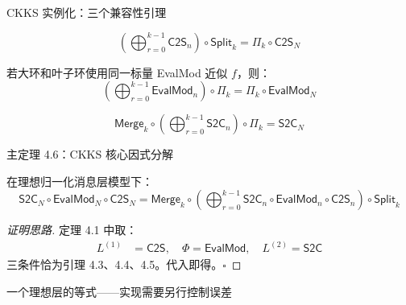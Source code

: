 \documentclass[aspectratio=169, 10pt, xcolor=svgnames, table, UTF8]{ctexbeamer}
\newcommand{\cots}{\mathsf{C2S}}
\newcommand{\stoc}{\mathsf{S2C}}
\newcommand{\evalmod}{\mathsf{EvalMod}}
\newcommand{\splitop}{\mathsf{Split}}
\newcommand{\mergeop}{\mathsf{Merge}}
\begin{document}
\begin{frame}{CKKS 实例化：三个兼容性引理}
  \begin{lemma}[引理 4.3: Split-C2S]
    \[
    \boxed{\left(\bigoplus_{r=0}^{k-1} \cots_n\right) \circ \splitop_k = \Pi_k \circ \cots_N}
    \]
  \end{lemma}
  
  \pause
  
  \begin{lemma}
    若大环和叶子环使用同一标量 EvalMod 近似 \(f\)，则：
    \[
    \boxed{\left(\bigoplus_{r=0}^{k-1} \evalmod_n\right) \circ \Pi_k = \Pi_k \circ \evalmod_N}
    \]
  \end{lemma}
  
  \pause
  
  \begin{lemma}
    \[
    \boxed{\mergeop_k \circ \left(\bigoplus_{r=0}^{k-1} \stoc_n\right) \circ \Pi_k = \stoc_N}
    \]
  \end{lemma}
\end{frame}

\begin{frame}{主定理 4.6：CKKS 核心因式分解}
  \begin{theorem}[定理 4.6]
    在理想归一化消息层模型下：
    \[
    \boxed{\stoc_N \circ \evalmod_N \circ \cots_N
    = \mergeop_k \circ \left(\bigoplus_{r=0}^{k-1}
    \stoc_n \circ \evalmod_n \circ \cots_n
    \right) \circ \splitop_k}
    \]
  \end{theorem}
  
  \pause
  
  \begin{proof}[证明思路]
    定理 4.1 中取：
    \begin{align*}
      L^{(1)} &= \cots, \quad \Phi = \evalmod, \quad L^{(2)} = \stoc
    \end{align*}
    三条件恰为引理 4.3、4.4、4.5。代入即得。\(\square\)
  \end{proof}
  
  \begin{center}
    \alert{一个理想层的等式——实现需要另行控制误差}
  \end{center}
\end{frame}
\end{document}

